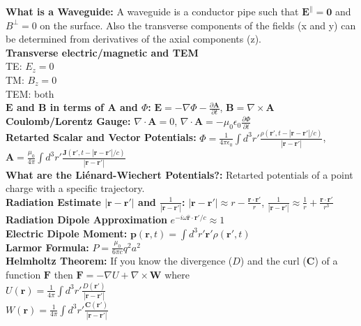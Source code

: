 \documentclass[12pt]{extarticle}
\newcommand{\E}{\mathbf{E}}
\newcommand{\B}{\mathbf{B}}
\newcommand{\A}{\mathbf{A}}
\newcommand{\J}{\mathbf{J}}
\renewcommand{\r}{\mathbf{r}}
\newcommand{\wavr}{\left|\r-\r'\right|}
\begin{document}
\textbf{What is a Waveguide:} A waveguide is a conductor pipe such that $\E^\parallel = \mathbf{0}$ and $B^\perp = 0$ on the surface. Also the transverse components of the fields (x and y) can be determined from derivatives of the axial components (z). \\
\textbf{Transverse electric/magnetic and TEM} \\
TE: $E_z = 0$ \\
TM: $B_z = 0$ \\
TEM: both \\
\textbf{$\E$ and $\B$ in terms of $\A$ and $\Phi$:} $\E = -\nabla\Phi - \frac{\partial\A}{\partial t}$, $\B = \nabla\times\A$ \\
\textbf{Coulomb/Lorentz Gauge:} $\nabla\cdot\A = 0$, $\nabla\cdot\A = -\mu_0\epsilon_0\frac{\partial\Phi}{\partial t}$ \\
\textbf{Retarted Scalar and Vector Potentials:} $\Phi = \frac{1}{4\pi\epsilon_0} \int d^3r' \frac{\rho(\r',t-\wavr/c)}{\wavr}$, $\A = \frac{\mu_0}{4\pi} \int d^3r' \frac{\J(\r',t-\wavr/c)}{\wavr}$ \\
\textbf{What are the Li\'enard-Wiechert Potentials?:} Retarted potentials of a point charge with a specific trajectory. \\
\textbf{Radiation Estimate $\wavr$ and $\frac{1}{\wavr}$:} $\wavr \approx r-\frac{\r\cdot\r'}{r}$, $\frac{1}{\wavr} \approx \frac{1}{r} + \frac{\r\cdot\r'}{r^3}$ \\
\textbf{Radiation Dipole Approximation} $e^{-i\omega\hat{\r}\cdot\r'/c} \approx 1$ \\
\textbf{Electric Dipole Moment:} $\mathbf{p}(\r,t) = \int d^3r'\r'\rho(\r',t)$ \\
\textbf{Larmor Formula:} $P = \frac{\mu_0}{6\pi c}q^2a^2$ \\
\textbf{Helmholtz Theorem:} If you know the divergence ($D$) and the curl ($\mathbf{C}$) of a function $\mathbf{F}$ then $\mathbf{F} = -\nabla U + \nabla\times\mathbf{W}$ where \\
$U(\r) = \frac{1}{4\pi} \int d^3r' \frac{D(\r')}{\wavr}$ \\
$W(\r) = \frac{1}{4\pi} \int d^3r' \frac{\mathbf{C}(\r')}{\wavr}$ \\
\end{document}

